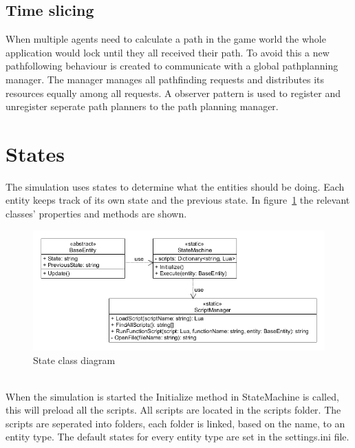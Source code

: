 \documentclass[10pt]{extarticle} %
\begin{document}
   \subsection {Time slicing}
  When multiple agents need to calculate a path in the game world the whole application would lock until they all received their path. To avoid this a new pathfollowing behaviour is created to communicate with a global pathplanning manager. The manager manages all pathfinding requests and distributes its resources equally among all requests. A observer pattern is used to register and unregister seperate path planners to the path planning manager.
   
 
   \newpage   
   \section {States}
   The simulation uses states to determine what the entities should be doing. Each entity keeps track of its own state and the previous state. In figure~\ref{fig:stateClassDiagram} the relevant classes' properties and methods are shown.
   \begin{figure}[h!]
   \includegraphics[width=\textwidth]{stateuml.png}
   \caption{State class diagram}
   \label{fig:stateClassDiagram}
   \end{figure}
   \\When the simulation is started the Initialize method in StateMachine is called, this will preload all the scripts. All scripts are located in the scripts folder. The scripts are seperated into folders, each folder is linked, based on the name, to an entity type.
   The default states for every entity type are set in the settings.ini file.
\end{document}
